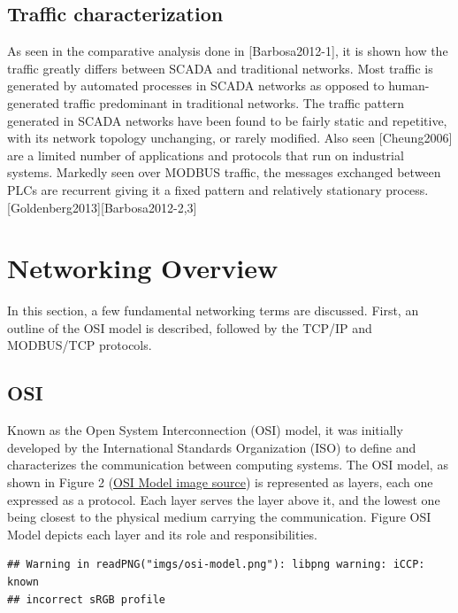 \documentclass[12pt,]{article}
\begin{document}
\subsection{Traffic characterization}\label{traffic-characterization}

As seen in the comparative analysis done in {[}Barbosa2012-1{]}, it is
shown how the traffic greatly differs between SCADA and traditional
networks. Most traffic is generated by automated processes in SCADA
networks as opposed to human-generated traffic predominant in
traditional networks. The traffic pattern generated in SCADA networks
have been found to be fairly static and repetitive, with its network
topology unchanging, or rarely modified. Also seen {[}Cheung2006{]} are
a limited number of applications and protocols that run on industrial
systems. Markedly seen over MODBUS traffic, the messages exchanged
between PLCs are recurrent giving it a fixed pattern and relatively
stationary process.{[}Goldenberg2013{]}{[}Barbosa2012-2,3{]}

\pagebreak

\section{Networking Overview}\label{networking-overview}

In this section, a few fundamental networking terms are discussed.
First, an outline of the OSI model is described, followed by the TCP/IP
and MODBUS/TCP protocols.

\subsection{OSI}\label{osi}

Known as the Open System Interconnection (OSI) model, it was initially
developed by the International Standards Organization (ISO) to define
and characterizes the communication between computing systems. The OSI
model, as shown in Figure 2
(\href{https://engineering.linkedin.com/endorsements/geographic-trends-skills-using-linkedins-endorsement-feature}{OSI
Model image source}) is represented as layers, each one expressed as a
protocol. Each layer serves the layer above it, and the lowest one being
closest to the physical medium carrying the communication. Figure OSI
Model depicts each layer and its role and responsibilities.

\begin{verbatim}
## Warning in readPNG("imgs/osi-model.png"): libpng warning: iCCP: known
## incorrect sRGB profile
\end{verbatim}
\end{document}

